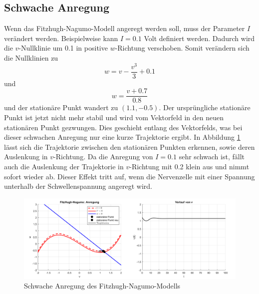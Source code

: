 \begin{refsection}
\subsection{Schwache Anregung}
Wenn das Fitzhugh-Nagumo-Modell angeregt werden soll, muss der Parameter $I$ verändert werden.
Beispielweise kann $I = 0.1$ Volt definiert werden.
Dadurch wird die $v$-Nullklinie um 0.1 in positive $w$-Richtung verschoben.
Somit verändern sich die Nullklinien zu \[ w = v - \frac{v^3}{3} + 0.1\]
und \[w = \frac{v + 0.7}{0.8}\] und der stationäre Punkt wandert zu $(1.1 ,-0.5)$.
Der ursprüngliche stationäre Punkt ist jetzt nicht mehr stabil und wird vom Vektorfeld in den neuen stationären Punkt
gezwungen.
Dies geschieht entlang des Vektorfelds, was bei dieser schwachen Anregung nur eine kurze Trajektorie ergibt.
In Abbildung \ref{fig:schwacheAnregung} lässt sich die Trajektorie zwischen den stationären Punkten erkennen, sowie
deren Auslenkung in $v$-Richtung.
Da die Anregung von $I = 0.1$ sehr schwach ist, fällt auch die Auslenkung der Trajektorie in $v$-Richtung mit 0.2 klein aus und
nimmt sofort wieder ab. 
Dieser Effekt tritt auf, wenn die Nervenzelle mit einer Spannung unterhalb der Schwellenspannung angeregt wird.
\begin{figure}[h]
    \centering
    \includegraphics[width=\textwidth]{papers/nerven/Bilder/schwacheAnregung.png}
    \caption{Schwache Anregung des Fitzhugh-Nagumo-Modells}
    \label{fig:schwacheAnregung}
\end{figure}

\end{refsection}
